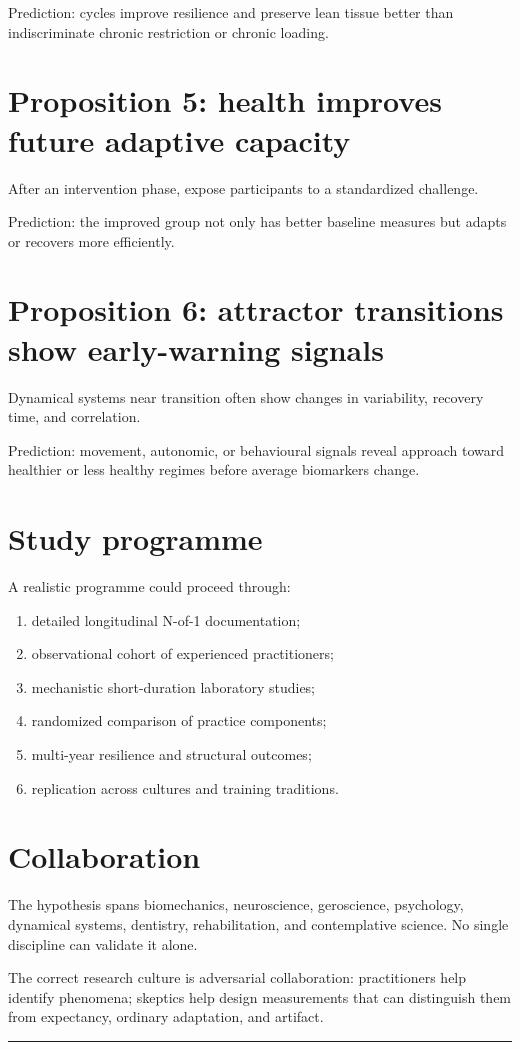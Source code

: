 Prediction: cycles improve resilience and preserve lean tissue better than indiscriminate chronic restriction or chronic loading.

\section{Proposition 5: health improves future adaptive capacity}

After an intervention phase, expose participants to a standardized challenge.

Prediction: the improved group not only has better baseline measures but adapts or recovers more efficiently.

\section{Proposition 6: attractor transitions show early-warning signals}

Dynamical systems near transition often show changes in variability, recovery time, and correlation.

Prediction: movement, autonomic, or behavioural signals reveal approach toward healthier or less healthy regimes before average biomarkers change.

\section{Study programme}

A realistic programme could proceed through:

\begin{enumerate}
\def\labelenumi{\arabic{enumi}.}
\tightlist
\item
  detailed longitudinal N-of-1 documentation;
\item
  observational cohort of experienced practitioners;
\item
  mechanistic short-duration laboratory studies;
\item
  randomized comparison of practice components;
\item
  multi-year resilience and structural outcomes;
\item
  replication across cultures and training traditions.
\end{enumerate}

\section{Collaboration}

The hypothesis spans biomechanics, neuroscience, geroscience, psychology, dynamical systems, dentistry, rehabilitation, and contemplative science. No single discipline can validate it alone.

The correct research culture is adversarial collaboration: practitioners help identify phenomena; skeptics help design measurements that can distinguish them from expectancy, ordinary adaptation, and artifact.

\begin{center}\rule{0.5\linewidth}{0.5pt}\end{center}
